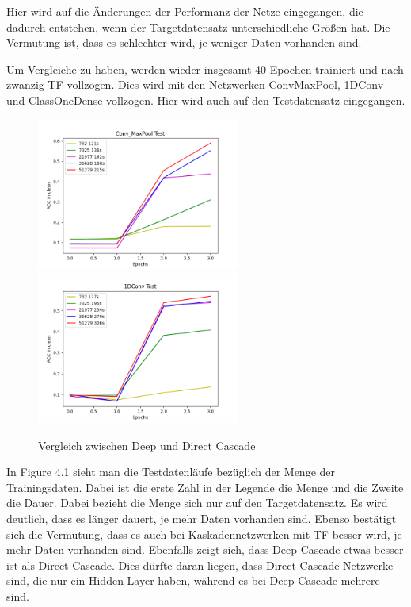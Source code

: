 Hier wird auf die Änderungen der Performanz der Netze eingegangen, die dadurch entstehen, wenn der Targetdatensatz unterschiedliche Größen hat. 
Die Vermutung ist, dass es schlechter wird, je weniger Daten vorhanden sind. 

Um Vergleiche zu haben, werden wieder insgesamt 40 Epochen trainiert und nach zwanzig TF vollzogen. Dies wird mit den Netzwerken 
ConvMaxPool, 1DConv und ClassOneDense vollzogen. Hier wird auch auf den Testdatensatz eingegangen. 

\begin{figure}[htpb]
    \includegraphics[height=5cm]{../../Plots/ba_plots/targetgroesse/cmp_ts.png}
    \includegraphics[height=5cm]{../../Plots/ba_plots/targetgroesse/1dc_ts.png}
    \caption{\label{fig:targetgroessedeepdir} Vergleich zwischen Deep und Direct Cascade}
\end{figure}

In Figure 4.1 sieht man die Testdatenläufe bezüglich der Menge der Trainingsdaten. Dabei ist die erste Zahl in der Legende die Menge und die 
Zweite die Dauer. Dabei bezieht die Menge sich nur auf den Targetdatensatz. Es wird deutlich, dass es länger dauert, je mehr Daten vorhanden sind. 
Ebenso bestätigt sich die Vermutung, dass es auch bei Kaskadennetzwerken mit TF besser wird, je mehr Daten vorhanden sind. 
Ebenfalls zeigt sich, dass Deep Cascade etwas besser ist als Direct Cascade. Dies dürfte daran liegen, dass Direct Cascade Netzwerke sind, 
die nur ein Hidden Layer haben, während es bei Deep Cascade mehrere sind. 

